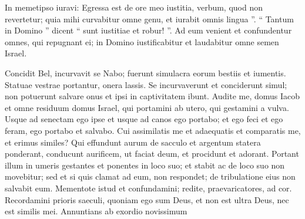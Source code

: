 \begin{biblechapter}
\begin{biblechapter}
\begin{biblechapter}
\begin{biblechapter}
\begin{biblechapter}
\begin{biblechapter}
\begin{biblechapter}
\begin{biblechapter}
\begin{biblechapter}
\begin{biblechapter}
\begin{biblechapter}
\begin{biblechapter}
\begin{biblechapter}
\begin{biblechapter}
\begin{biblechapter}
\begin{biblechapter}
\begin{biblechapter}
\begin{biblechapter}
\begin{biblechapter}
\begin{biblechapter}
\begin{biblechapter}
\begin{biblechapter}
\begin{biblechapter}
\begin{biblechapter}
\begin{biblechapter}
\begin{biblechapter}
\begin{biblechapter}
\begin{biblechapter}
\begin{biblechapter}
\begin{biblechapter}
\begin{biblechapter}
\begin{biblechapter}
\begin{biblechapter}
\begin{biblechapter}
\begin{biblechapter}
\begin{biblechapter}
\begin{biblechapter}
\begin{biblechapter}
\begin{biblechapter}
\begin{biblechapter}
\begin{biblechapter}
\begin{biblechapter}
\begin{biblechapter}
\begin{biblechapter}
\begin{biblechapter}
 \verse In memetipso iuravi:
 Egressa est de ore meo iustitia,
 verbum, quod non revertetur;
 quia mihi curvabitur omne genu,
 et iurabit omnis lingua ”.
 \verse “ Tantum in Domino ” dicent
 “ sunt iustitiae et robur! ”.
 Ad eum venient et confundentur
 omnes, qui repugnant ei;
 \verse in Domino iustificabitur et laudabitur
 omne semen Israel.
 
\begin{biblechapter}
\verse Concidit Bel, incurvavit se Nabo;
 fuerunt simulacra eorum bestiis et iumentis.
 Statuae vestrae portantur, onera lassis.
 \verse Se incurvaverunt et conciderunt simul;
 non potuerunt salvare onus
 et ipsi in captivitatem ibunt.
 \verse Audite me, domus Iacob
 et omne residuum domus Israel,
 qui portamini ab utero,
 qui gestamini a vulva.
 \verse Usque ad senectam ego ipse
 et usque ad canos ego portabo;
 et ego feci et ego feram,
 ego portabo et salvabo.
 \verse Cui assimilatis me et adaequatis
 et comparatis me, et erimus similes?
 \verse Qui effundunt aurum de sacculo
 et argentum statera ponderant,
 conducunt aurificem, ut faciat deum,
 et procidunt et adorant.
 \verse Portant illum in umeris gestantes
 et ponentes in loco suo;
 et stabit ac de loco suo non movebitur;
 sed et si quis clamat ad eum, non respondet;
 de tribulatione eius non salvabit eum.
 \verse Mementote istud et confundamini;
 redite, praevaricatores, ad cor.
 \verse Recordamini prioris saeculi,
 quoniam ego sum Deus,
 et non est ultra Deus,
 nec est similis mei.
 \verse Annuntians ab exordio novissimum

\end{biblechapter}
\end{biblechapter}
\end{biblechapter}
\end{biblechapter}
\end{biblechapter}
\end{biblechapter}
\end{biblechapter}
\end{biblechapter}
\end{biblechapter}
\end{biblechapter}
\end{biblechapter}
\end{biblechapter}
\end{biblechapter}
\end{biblechapter}
\end{biblechapter}
\end{biblechapter}
\end{biblechapter}
\end{biblechapter}
\end{biblechapter}
\end{biblechapter}
\end{biblechapter}
\end{biblechapter}
\end{biblechapter}
\end{biblechapter}
\end{biblechapter}
\end{biblechapter}
\end{biblechapter}
\end{biblechapter}
\end{biblechapter}
\end{biblechapter}
\end{biblechapter}
\end{biblechapter}
\end{biblechapter}
\end{biblechapter}
\end{biblechapter}
\end{biblechapter}
\end{biblechapter}
\end{biblechapter}
\end{biblechapter}
\end{biblechapter}
\end{biblechapter}
\end{biblechapter}
\end{biblechapter}
\end{biblechapter}
\end{biblechapter}
\end{biblechapter}
